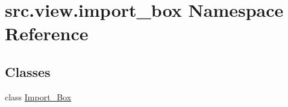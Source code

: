 \hypertarget{namespacesrc_1_1view_1_1import__box}{}\section{src.\+view.\+import\+\_\+box Namespace Reference}
\label{namespacesrc_1_1view_1_1import__box}
\subsection*{Classes}
\begin{DoxyCompactItemize}
\item 
class \hyperlink{classsrc_1_1view_1_1import__box_1_1Import__Box}{Import\+\_\+\+Box}
\end{DoxyCompactItemize}
